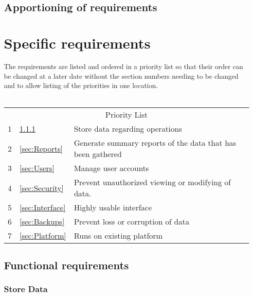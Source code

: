 \documentclass[12pt]{article}
\begin{document}
\subsection{Apportioning of requirements}

\section{Specific requirements}
The requirements are listed and ordered in a priority list so that their order can be changed at a later date without the section numbers needing to be changed and to allow listing of the priorities in one location.\\
\\
\begin{tabular}{l | l p{5.25in}}
\multicolumn{3}{c}{Priority List}\\
1 &\ref{sec:Store Data}			& Store data regarding operations \\
2 &\ref{sec:Reports}			& Generate summary reports of the data that has been gathered\\
3 &\ref{sec:Users}				& Manage user accounts\\
4 &\ref{sec:Security}			& Prevent unauthorized viewing or modifying of data. \\
5 &\ref{sec:Interface}			& Highly usable interface\\ 
6 &\ref{sec:Backups}			& Prevent loss or corruption of data\\
7 &\ref{sec:Platform}			& Runs on existing platform\\
\end{tabular}
\begin{comment}
The first 2 are to be considered absolutely critical. The software cannot be considered useful if those features are absent.

What are the security implications of storing identifiable time sheet info for employees??
\end{comment}

\subsection{Functional requirements}
 
\subsubsection{Store Data}\label{sec:Store Data}
\end{document}
